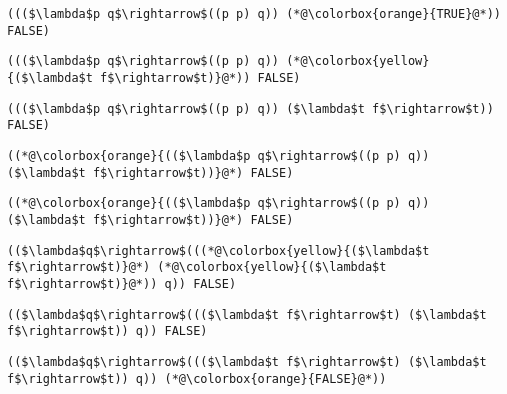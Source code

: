 \documentclass{beamer}
\begin{document}
\begin{frame}[fragile]{\CurrentSection}
\lstset{basicstyle=\ttfamily\small}\lstset{numbers=none}\lstset{language=ML}\begin{lstlisting}
((($\lambda$p q$\rightarrow$((p p) q)) (*@\colorbox{orange}{TRUE}@*)) FALSE)
\end{lstlisting}
\pause\lstset{language=ML}\begin{lstlisting}
((($\lambda$p q$\rightarrow$((p p) q)) (*@\colorbox{yellow}{($\lambda$t f$\rightarrow$t)}@*)) FALSE)
\end{lstlisting}

\end{frame}

\begin{frame}[fragile]{\CurrentSection}
\lstset{basicstyle=\ttfamily\small}\lstset{numbers=none}\lstset{language=ML}\begin{lstlisting}
((($\lambda$p q$\rightarrow$((p p) q)) ($\lambda$t f$\rightarrow$t)) FALSE)
\end{lstlisting}
\pause\lstset{language=ML}\begin{lstlisting}
((*@\colorbox{orange}{(($\lambda$p q$\rightarrow$((p p) q)) ($\lambda$t f$\rightarrow$t))}@*) FALSE)
\end{lstlisting}

\end{frame}

\begin{frame}[fragile]{\CurrentSection}
\lstset{basicstyle=\ttfamily\small}\lstset{numbers=none}\lstset{language=ML}\begin{lstlisting}
((*@\colorbox{orange}{(($\lambda$p q$\rightarrow$((p p) q)) ($\lambda$t f$\rightarrow$t))}@*) FALSE)
\end{lstlisting}
\pause\lstset{language=ML}\begin{lstlisting}
(($\lambda$q$\rightarrow$(((*@\colorbox{yellow}{($\lambda$t f$\rightarrow$t)}@*) (*@\colorbox{yellow}{($\lambda$t f$\rightarrow$t)}@*)) q)) FALSE)
\end{lstlisting}

\end{frame}

\begin{frame}[fragile]{\CurrentSection}
\lstset{basicstyle=\ttfamily\small}\lstset{numbers=none}\lstset{language=ML}\begin{lstlisting}
(($\lambda$q$\rightarrow$((($\lambda$t f$\rightarrow$t) ($\lambda$t f$\rightarrow$t)) q)) FALSE)
\end{lstlisting}
\pause\lstset{language=ML}\begin{lstlisting}
(($\lambda$q$\rightarrow$((($\lambda$t f$\rightarrow$t) ($\lambda$t f$\rightarrow$t)) q)) (*@\colorbox{orange}{FALSE}@*))
\end{lstlisting}

\end{frame}
\end{document}
